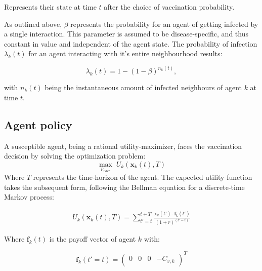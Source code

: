 \documentclass[11pt]{article}
\begin{document}
Represents their state at time \(t\) after the choice of vaccination probability. 


As outlined above, \(\beta\) represents the probability for an agent of getting infected by a single interaction. This parameter is assumed to be disease-specific, and thus constant in value and independent of the agent state. The probability of infection \(\lambda_{k}(t)\) for an agent interacting with it's entire neighbourhood results:

\begin{equation}\label{eq:5}
	\lambda_{k}(t)=1-(1-\beta)^{n_{k}(t)},
\end{equation}

with \(n_{k}(t)\) being the instantaneous amount of infected neighbours of agent \(k\) at time \(t\). %

\subsection{Agent policy}

A susceptible agent, being a rational utility-maximizer, faces the vaccination decision by solving the optimization problem:
\begin{equation}\label{eq:6}
	\max_{{p_{vacc}}} \; U_k(\mathbf{x}_k(t), T)
\end{equation}
Where \(T\) represents the time-horizon of the agent. The expected utility function takes the subsequent form, following the Bellman equation for a discrete-time Markov process:

\begin{equation}\label{eq:7}
	\begin{split}
		U_k(\mathbf{x}_k(t), T) = \sum_{t'=t}^{t + T} \frac{\mathbf{x}_k(t') \cdot \mathbf{f}_k(t')}{(1+r)^{(t'-t)}}
	\end{split}
\end{equation}

Where \(\mathbf{f}_k(t)\) is the payoff vector of agent \(k\) with: 

\begin{equation}\label{eq:8}
	\mathbf{f}_k(t' = t)=\left( \begin{array}{cccc}0&0&0&-C_{v,k} \end{array} \right)^T
\end{equation}
\end{document}
